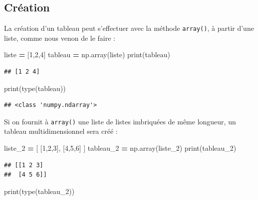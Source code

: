\documentclass[
  12pt,
]{book}
\newenvironment{Shaded}{\begin{snugshade}}{\end{snugshade}}
\newcommand{\BuiltInTok}[1]{#1}
\newcommand{\DecValTok}[1]{\textcolor[rgb]{0.00,0.00,0.81}{#1}}
\newcommand{\NormalTok}[1]{#1}
\newcommand{\OperatorTok}[1]{\textcolor[rgb]{0.81,0.36,0.00}{\textbf{#1}}}
\numberwithin{equation}{section}
\numberwithin{countremarque}{section}
\begin{document}
\subsection{Création}\label{cruxe9ation}

La création d'un tableau peut s'effectuer avec la méthode \texttt{array()}, à partir d'une liste, comme nous venon de le faire :

\begin{Shaded}
\begin{Highlighting}[]
\NormalTok{liste }\OperatorTok{=}\NormalTok{ [}\DecValTok{1}\NormalTok{,}\DecValTok{2}\NormalTok{,}\DecValTok{4}\NormalTok{]}
\NormalTok{tableau }\OperatorTok{=}\NormalTok{ np.array(liste)}
\BuiltInTok{print}\NormalTok{(tableau)}
\end{Highlighting}
\end{Shaded}

\begin{lstlisting}
## [1 2 4]
\end{lstlisting}

\begin{Shaded}
\begin{Highlighting}[]
\BuiltInTok{print}\NormalTok{(}\BuiltInTok{type}\NormalTok{(tableau))}
\end{Highlighting}
\end{Shaded}

\begin{lstlisting}
## <class 'numpy.ndarray'>
\end{lstlisting}

Si on fournit à \texttt{array()} une liste de listes imbriquées de même longueur, un tableau multidimensionnel sera créé :

\begin{Shaded}
\begin{Highlighting}[]
\NormalTok{liste\_2 }\OperatorTok{=}\NormalTok{ [ [}\DecValTok{1}\NormalTok{,}\DecValTok{2}\NormalTok{,}\DecValTok{3}\NormalTok{], [}\DecValTok{4}\NormalTok{,}\DecValTok{5}\NormalTok{,}\DecValTok{6}\NormalTok{] ]}
\NormalTok{tableau\_2 }\OperatorTok{=}\NormalTok{ np.array(liste\_2)}
\BuiltInTok{print}\NormalTok{(tableau\_2)}
\end{Highlighting}
\end{Shaded}

\begin{lstlisting}
## [[1 2 3]
##  [4 5 6]]
\end{lstlisting}

\begin{Shaded}
\begin{Highlighting}[]
\BuiltInTok{print}\NormalTok{(}\BuiltInTok{type}\NormalTok{(tableau\_2))}
\end{Highlighting}
\end{Shaded}
\end{document}
